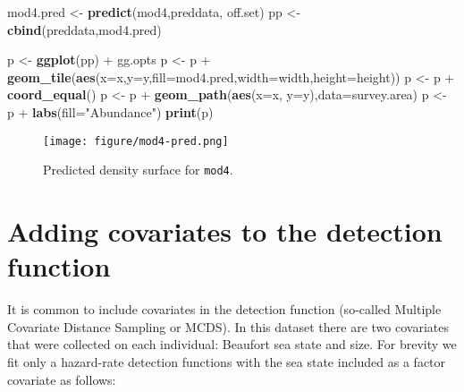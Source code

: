 \documentclass[]{article}
\newenvironment{Shaded}{}{}
\newcommand{\KeywordTok}[1]{\textcolor[rgb]{0.00,0.44,0.13}{\textbf{{#1}}}}
\newcommand{\DataTypeTok}[1]{\textcolor[rgb]{0.56,0.13,0.00}{{#1}}}
\newcommand{\StringTok}[1]{\textcolor[rgb]{0.25,0.44,0.63}{{#1}}}
\newcommand{\OtherTok}[1]{\textcolor[rgb]{0.00,0.44,0.13}{{#1}}}
\newcommand{\NormalTok}[1]{{#1}}
\begin{document}
\begin{Shaded}
\begin{Highlighting}[]
\NormalTok{mod4.pred <-}\StringTok{ }\KeywordTok{predict}\NormalTok{(mod4,preddata, off.set)}
\NormalTok{pp <-}\StringTok{ }\KeywordTok{cbind}\NormalTok{(preddata,mod4.pred)}

\NormalTok{p <-}\StringTok{ }\KeywordTok{ggplot}\NormalTok{(pp) +}\StringTok{ }\NormalTok{gg.opts}
\NormalTok{p <-}\StringTok{ }\NormalTok{p +}\StringTok{ }\KeywordTok{geom_tile}\NormalTok{(}\KeywordTok{aes}\NormalTok{(}\DataTypeTok{x=}\NormalTok{x,}\DataTypeTok{y=}\NormalTok{y,}\DataTypeTok{fill=}\NormalTok{mod4.pred,}\DataTypeTok{width=}\NormalTok{width,}\DataTypeTok{height=}\NormalTok{height))}
\NormalTok{p <-}\StringTok{ }\NormalTok{p +}\StringTok{ }\KeywordTok{coord_equal}\NormalTok{()}
\NormalTok{p <-}\StringTok{ }\NormalTok{p +}\StringTok{ }\KeywordTok{geom_path}\NormalTok{(}\KeywordTok{aes}\NormalTok{(}\DataTypeTok{x=}\NormalTok{x, }\DataTypeTok{y=}\NormalTok{y),}\DataTypeTok{data=}\NormalTok{survey.area)}
\NormalTok{p <-}\StringTok{ }\NormalTok{p +}\StringTok{ }\KeywordTok{labs}\NormalTok{(}\DataTypeTok{fill=}\StringTok{"Abundance"}\NormalTok{)}
\KeywordTok{print}\NormalTok{(p)}
\end{Highlighting}
\end{Shaded}

\begin{figure}[htbp]
\centering
\texttt{[image: figure/mod4-pred.png]}
\caption{Predicted density surface for \texttt{mod4}.}
\end{figure}

\section{Adding covariates to the detection
function}\label{adding-covariates-to-the-detection-function}

It is common to include covariates in the detection function (so-called
Multiple Covariate Distance Sampling or MCDS). In this dataset there are
two covariates that were collected on each individual: Beaufort sea
state and size. For brevity we fit only a hazard-rate detection
functions with the sea state included as a factor covariate as follows:

\begin{Shaded}
\end{Shaded}
\end{document}

